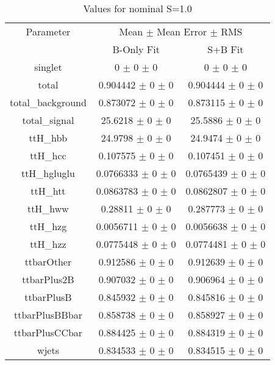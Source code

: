 \begin{table}
\centering
\caption{Values for nominal S=1.0}
\begin{tabular}{ccc}
\toprule
Parameter 	& \multicolumn{2}{c}{Mean $\pm$ Mean Error $\pm$ RMS}\\
 	& B-Only Fit & S+B Fit\\
\midrule
singlet 	& \num{0} $\pm$ \num{0} $\pm$ \num{0} 	& \num{0} $\pm$ \num{0} $\pm$ \num{0}\\
total 	& \num{0.904442} $\pm$ \num{0} $\pm$ \num{0} 	& \num{0.904444} $\pm$ \num{0} $\pm$ \num{0}\\
total\_background 	& \num{0.873072} $\pm$ \num{0} $\pm$ \num{0} 	& \num{0.873115} $\pm$ \num{0} $\pm$ \num{0}\\
total\_signal 	& \num{25.6218} $\pm$ \num{0} $\pm$ \num{0} 	& \num{25.5886} $\pm$ \num{0} $\pm$ \num{0}\\
ttH\_hbb 	& \num{24.9798} $\pm$ \num{0} $\pm$ \num{0} 	& \num{24.9474} $\pm$ \num{0} $\pm$ \num{0}\\
ttH\_hcc 	& \num{0.107575} $\pm$ \num{0} $\pm$ \num{0} 	& \num{0.107451} $\pm$ \num{0} $\pm$ \num{0}\\
ttH\_hgluglu 	& \num{0.0766333} $\pm$ \num{0} $\pm$ \num{0} 	& \num{0.0765439} $\pm$ \num{0} $\pm$ \num{0}\\
ttH\_htt 	& \num{0.0863783} $\pm$ \num{0} $\pm$ \num{0} 	& \num{0.0862807} $\pm$ \num{0} $\pm$ \num{0}\\
ttH\_hww 	& \num{0.28811} $\pm$ \num{0} $\pm$ \num{0} 	& \num{0.287773} $\pm$ \num{0} $\pm$ \num{0}\\
ttH\_hzg 	& \num{0.0056711} $\pm$ \num{0} $\pm$ \num{0} 	& \num{0.0056638} $\pm$ \num{0} $\pm$ \num{0}\\
ttH\_hzz 	& \num{0.0775448} $\pm$ \num{0} $\pm$ \num{0} 	& \num{0.0774481} $\pm$ \num{0} $\pm$ \num{0}\\
ttbarOther 	& \num{0.912586} $\pm$ \num{0} $\pm$ \num{0} 	& \num{0.912639} $\pm$ \num{0} $\pm$ \num{0}\\
ttbarPlus2B 	& \num{0.907032} $\pm$ \num{0} $\pm$ \num{0} 	& \num{0.906964} $\pm$ \num{0} $\pm$ \num{0}\\
ttbarPlusB 	& \num{0.845932} $\pm$ \num{0} $\pm$ \num{0} 	& \num{0.845816} $\pm$ \num{0} $\pm$ \num{0}\\
ttbarPlusBBbar 	& \num{0.858738} $\pm$ \num{0} $\pm$ \num{0} 	& \num{0.858927} $\pm$ \num{0} $\pm$ \num{0}\\
ttbarPlusCCbar 	& \num{0.884425} $\pm$ \num{0} $\pm$ \num{0} 	& \num{0.884319} $\pm$ \num{0} $\pm$ \num{0}\\
wjets 	& \num{0.834533} $\pm$ \num{0} $\pm$ \num{0} 	& \num{0.834515} $\pm$ \num{0} $\pm$ \num{0}\\
\bottomrule
\end{tabular}
\end{table}